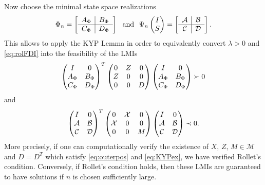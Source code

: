 Now choose the minimal state space realizations
\begin{equation*}
\Phi_n = \left[ \begin{array}{c|c}
	A_{\Phi} &B_{\Phi}\\ \hline C_{\Phi} &D_{\Phi}
\end{array} \right]
\text{\ \ and\ \ }
\Psi_n\pmatr{I\\S} = \left[ \begin{array}{c|c}
	\mathcal{A} &\mathcal{B}\\ \hline \mathcal{C}&\mathcal{D}
\end{array} \right].%
\end{equation*}
This allows to apply the KYP Lemma in order to equivalently convert $\lambda>0$ 
and \eqref{eq:rolFDI} into the feasibility of the LMIs
\begin{equation}
\begin{pmatrix}I &0\\A_{\Phi} &B_{\Phi}\\C_{\Phi}&D_{\Phi}\end{pmatrix}^T
\begin{pmatrix}0 &Z &0\\Z &0 &0\\0 &0 &D\end{pmatrix}
\begin{pmatrix}I &0\\A_{\Phi} &B_{\Phi}\\C_{\Phi}&D_{\Phi}\end{pmatrix} \succ 0
\label{eq:outerpos}
\end{equation}
and
\begin{equation}
\begin{pmatrix}I &0\\\mathcal{A} &\mathcal{B}\\\mathcal{C}&\mathcal{D}\end{pmatrix}^T
\begin{pmatrix}0 &\mathcal{X} &0\\ \mathcal{X}&0 &0\\0 &0 &M\end{pmatrix}
\begin{pmatrix}I &0\\\mathcal{A} &\mathcal{B}\\\mathcal{C}&\mathcal{D}\end{pmatrix} \prec 0.
\label{eq:KYPex}
\end{equation}
More precisely, if one can computationally verify the existence of $X$, $Z$, $M\in{\mathcal{M}}$
and $D=D^T$ which satisfy \eqref{eq:outerpos} and \eqref{eq:KYPex}, we have verified Rollet's
condition. Conversely, if Rollet's condition holds, then these LMIs are guaranteed to have
solutions if $n$ is chosen sufficiently large.

